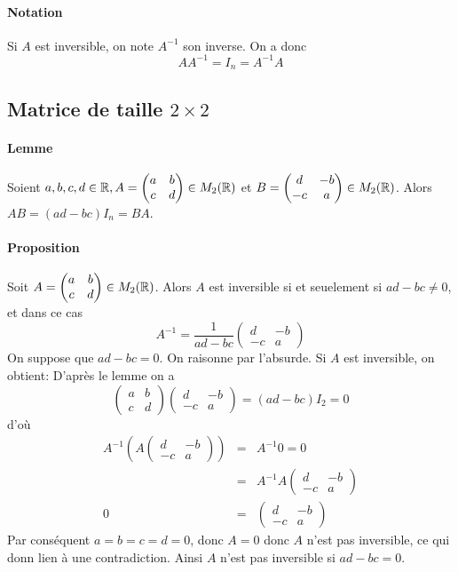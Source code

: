 \paragraph{Notation} Si $A$ est inversible, on note $A^{-1}$ son inverse. On a donc
$$A A^{-1} = I_n = A^{-1} A$$


%
\subsection{Matrice de taille $2\times 2$}
%
\paragraph{Lemme} Soient $a, b, c, d \in \mathbb{R}, A = \begin{pmatrix} a & b \\ c & d \end{pmatrix} \in M_{2}(\mathbb{R})$ et $B = \begin{pmatrix} d & -b \\ -c & a \end{pmatrix} \in M_{2}(\mathbb{R})$. Alors $A B = (a d - b c) I_n = B A$.

\paragraph{Proposition} Soit $A = \begin{pmatrix} a & b \\ c & d \end{pmatrix} \in M_{2}(\mathbb{R})$. Alors $A$ est inversible si et seuelement si $a d - b c \neq 0$, et dans ce cas
$$A^{-1} = \frac{1}{a d - b c} \begin{pmatrix} d & -b \\ -c & a \end{pmatrix}$$
On suppose que $a d - b c = 0$. On raisonne par l'absurde. Si $A$ est inversible, on obtient: D'après le lemme on a
$$\begin{pmatrix} a & b \\ c & d \end{pmatrix} \begin{pmatrix} d & -b \\ -c & a \end{pmatrix} = (a d - b c) I_2 = 0$$
d'où
\begin{eqnarray*}
  A^{-1} \left( A \begin{pmatrix} d & -b \\ -c & a \end{pmatrix} \right) &=& A^{-1} 0 = 0 \\
    &=& A^{-1} A \begin{pmatrix} d & -b \\ -c & a \end{pmatrix} \\
  0 &=& \begin{pmatrix} d & -b \\ -c & a \end{pmatrix}
\end{eqnarray*}
Par conséquent $a = b = c = d = 0$, donc $A = 0$ donc $A$ n'est pas inversible, ce qui donn lien à une contradiction. Ainsi $A$ n'est pas inversible si $a d - b c = 0$.

